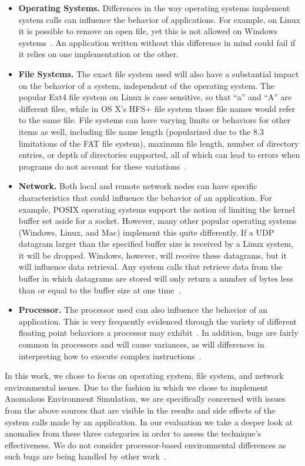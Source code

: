 \begin{itemize}

\item {\bf Operating Systems.} Differences in the way operating systems
implement system calls can influence the behavior of applications.  For
example, on Linux it is possible to remove an open file, yet this is not
allowed on Windows systems~\cite{UnlinkStandard}.  An application
written without this difference in mind could fail if it relies on one
implementation or the other.

\item {\bf File Systems.}  The exact file system used will also have a
substantial impact on the behavior of a system, independent of the
operating system.  The popular Ext4 file system on Linux is case sensitive,
so that ``a'' and ``A'' are different files,
while in OS X's HFS+ file system
those file names would refer to the same file.
File systems can have varying limits or behaviors for other items as well,
including file name length (popularized due to the 8.3 limitations of the
FAT file system), maximum file length, number of directory entries, or
depth
of directories supported, all of which can lead to errors when programs
do not account for these variations~\cite{EXT4Layout, AppleHFS}.

\item {\bf Network.} Both local and remote network nodes
can have specific characteristics that could influence the behavior of an
application.
For example, POSIX operating
systems support the notion of limiting the kernel buffer set aside for a
socket.  However, many other popular operating
systems (Windows, Linux, and Mac)
implement this quite differently.
If a UDP datagram
larger than the specified buffer size is received by a Linux system,
it will be dropped.
Windows,
however,
will receive these datagrams,
but it will influence data retrieval.
Any system calls that retrieve data from the buffer in which
datagrams are
stored will only return a number of bytes less than or equal to the
buffer size at one time~\cite{Zhuang_NSDI_2014}.

\item {\bf Processor.}  The processor used can also influence the
behavior of an application.  This is very frequently
evidenced through the variety of different floating point behaviors a
processor may exhibit~\cite{ArbitraryPrecision}.
In addition, bugs are fairly common
in processors and will cause variances, as will
differences in interpreting
how to execute complex instructions~\cite{Microarch}.

\end{itemize}

In this work, we chose to focus on operating system,
file system, and network
environmental issues.
Due to the fashion in which we chose
to implement Anomalous Environment Simulation,
we are specifically concerned with issues from the above sources
that are visible in the results and side effects of the system calls
made by an application.
In our evaluation we take a deeper look at anomalies from
these three categories in order to assess the technique's effectiveness.
We do not consider processor-based environmental differences as such
bugs are being handled by other
work~\cite{Alglave:2018:FSC:3173162.3177156}.
